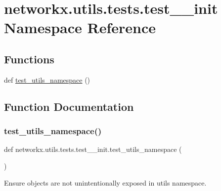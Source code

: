 \hypertarget{namespacenetworkx_1_1utils_1_1tests_1_1test____init}{}\section{networkx.\+utils.\+tests.\+test\+\_\+\+\_\+init Namespace Reference}
\label{namespacenetworkx_1_1utils_1_1tests_1_1test____init}
\subsection*{Functions}
\begin{DoxyCompactItemize}
\item 
def \hyperlink{namespacenetworkx_1_1utils_1_1tests_1_1test____init_a9c79e1e3568eb85cfb7093573ba6862e}{test\+\_\+utils\+\_\+namespace} ()
\end{DoxyCompactItemize}


\subsection{Function Documentation}
\mbox{\label{namespacenetworkx_1_1utils_1_1tests_1_1test____init_a9c79e1e3568eb85cfb7093573ba6862e}} 
\subsubsection{\texorpdfstring{test\+\_\+utils\+\_\+namespace()}{test\_utils\_namespace()}}
{\footnotesize\ttfamily def networkx.\+utils.\+tests.\+test\+\_\+\+\_\+init.\+test\+\_\+utils\+\_\+namespace (\begin{DoxyParamCaption}{ }\end{DoxyParamCaption})}

\begin{DoxyVerb}Ensure objects are not unintentionally exposed in utils namespace.\end{DoxyVerb}
 
